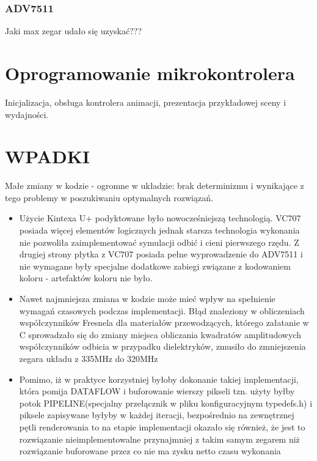 \subsubsection{ADV7511}
Jaki max zegar udało się uzyskać???

\section{Oprogramowanie mikrokontrolera}
Inicjalizacja, obsługa kontrolera animacji, prezentacja przykładowej sceny i wydajności.
\section{WPADKI}
Małe zmiany w kodzie - ogromne w układzie: brak determinizmu i wynikające z tego problemy w poszukiwaniu optymalnych rozwiązań.
\begin{itemize}
\item Użycie Kintexa U+ podyktowane było nowocześniejszą technologią. VC707 posiada więcej elementów logicznych jednak starsza technologia wykonania nie pozwoliła zaimplementować symulacji odbić i cieni pierwszego rzędu. Z drugiej strony płytka z VC707 posiada pełne wyprowadzenie do ADV7511 i nie wymagane były specjalne dodatkowe zabiegi związane z kodowaniem koloru - artefaktów koloru nie było.
\item Nawet najmniejsza zmiana w kodzie może mieć wpływ na spełnienie wymagań czasowych podczas implementacji. Błąd znaleziony w obliczeniach współczynników Fresnela dla materiałów przewodzących, którego załatanie w C sprowadzało się do zmiany miejsca obliczania kwadratów amplitudowych współczynników odbicia w przypadku dielektryków, zmusiło do zmniejszenia zegara układu z 335MHz do 320MHz
\item Pomimo, iż w praktyce korzystniej byłoby dokonanie takiej implementacji, która pomija DATAFLOW i buforowanie wierszy pikseli tzn. użyty byłby potok PIPELINE(specjalny przełącznik w pliku konfiguracyjnym typedefs.h) i piksele zapisywane byłyby w każdej iteracji, bezpośrednio na zewnętrznej pętli renderowania to na etapie implementacji okazało się również, że jest to rozwiązanie nieimplementowalne przynajmniej z takim samym zegarem niż rozwiązanie buforowane przez co nie ma zysku netto czasu wykonania

\end{itemize}
